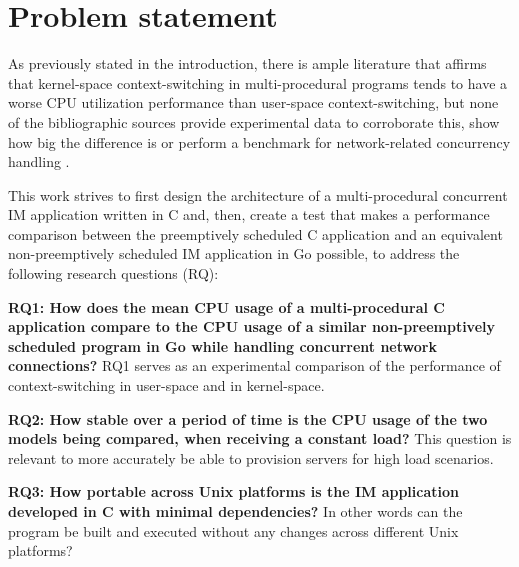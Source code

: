 \section{Problem statement}
As previously stated in the introduction, there is ample literature that affirms that kernel-space context-switching in multi-procedural programs tends to have a worse CPU utilization performance than user-space context-switching, but none of the bibliographic sources provide experimental data to corroborate this, show how big the difference is or perform a benchmark for network-related concurrency handling \cite{2003Events}\cite{2005Threads}\cite{2013ContextSwitching}\cite{Cox-Buday2017}\cite{Kerrisk2010}.

This work strives to first design the architecture of a multi-procedural concurrent IM application written in C and, then, create a test that makes a performance comparison between the preemptively scheduled C application and an equivalent non-preemptively scheduled IM application in Go possible, to address the following research questions (RQ):

\textbf{RQ1: How does the mean CPU usage of a multi-procedural C application compare to the CPU usage of a similar non-preemptively scheduled program in Go while handling concurrent network connections?} RQ1 serves as an experimental comparison of the performance of context-switching in user-space and in kernel-space. 

\textbf{RQ2: How stable over a period of time is the CPU usage of the two models being compared, when receiving a constant load?} This question is relevant to more accurately be able to provision servers for high load scenarios.

\textbf{RQ3: How portable across Unix platforms is the IM application developed in C with minimal dependencies?} In other words can the program be built and executed without any changes across different Unix platforms?




